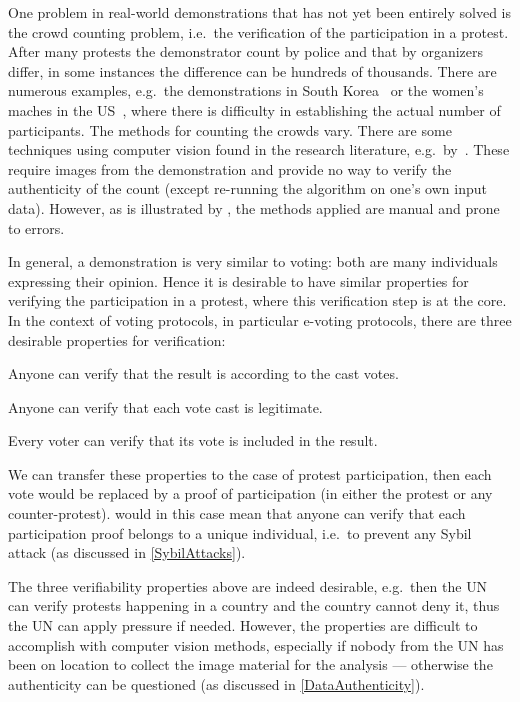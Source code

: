 One problem in real-world demonstrations that has not yet been entirely solved 
is the crowd counting problem, i.e.\ the verification of the participation in 
a protest.
After many protests the demonstrator count by police and that by organizers 
differ, in some instances the difference can be hundreds of thousands.
There are numerous examples, e.g.\ the demonstrations in South 
Korea~\cite{2016DemonstrationsInSeoul} or the women's maches in the 
US~\cite{2017WomensMarchesInUS}, where there is difficulty in establishing the 
actual number of participants.
The methods for counting the crowds vary.
There are some techniques using computer vision found in the research 
literature, e.g.\ by~\textcite{CVCrowdCounting}.
These require images from the demonstration and provide no way to verify the 
authenticity of the count (except re-running the algorithm on one's own input 
data).
However, as is illustrated by 
\textcite{2016DemonstrationsInSeoul,2017WomensMarchesInUS}, the methods applied
are manual and prone to errors.

In general, a demonstration is very similar to voting: both are many 
individuals expressing their opinion.
Hence it is desirable to have similar properties for verifying the 
participation in a protest, where this verification step is at the core.
In the context of voting protocols, in particular e-voting protocols, there are 
three desirable properties for verification:
\begin{properties}
\item\label{UniversalVerif} Anyone can verify that the result is according to 
  the cast votes.
\item\label{EligibilityVerif} Anyone can verify that each vote cast is 
  legitimate.
\item\label{IndividualVerif} Every voter can verify that its vote is included 
  in the result.
\end{properties}
We can transfer these properties to the case of protest participation, then 
each vote would be replaced by a proof of participation (in either the protest 
or any counter-protest).
 would in this case mean that anyone can verify that 
each participation proof belongs to a unique individual, i.e.\ to prevent any 
Sybil attack (as discussed in \cref{SybilAttacks}).

The three verifiability properties above are indeed desirable, e.g.\ then the 
\ac{UN} can verify protests happening in a country and the country cannot deny 
it, thus the \ac{UN} can apply pressure if needed.
However, the properties are difficult to accomplish with computer vision 
methods, especially if nobody from the \ac{UN} has been on location to collect 
the image material for the analysis --- otherwise the authenticity can be 
questioned (as discussed in \cref{DataAuthenticity}).


